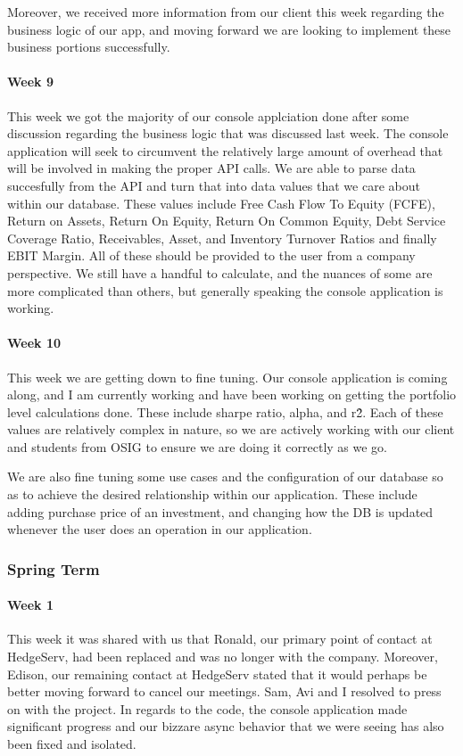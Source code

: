 \documentclass{article}
\begin{document}
Moreover, we received more information from our client this week regarding the business logic of our app, and moving forward we are looking to implement these business portions successfully.
\paragraph{Week 9}
This week we got the majority of our console applciation done after some discussion regarding the business logic that was discussed last week. The console application will seek to circumvent the relatively large amount of overhead that will be involved in making the proper API calls. We are able to parse data succesfully from the API and turn that into data values that we care about within our database. These values include Free Cash Flow To Equity (FCFE), Return on Assets, Return On Equity, Return On Common Equity, Debt Service Coverage Ratio, Receivables, Asset, and Inventory Turnover Ratios and finally EBIT Margin. 
All of these should be provided to the user from a company perspective. We still have a handful to calculate, and the nuances of some are more complicated than others, but generally speaking the console application is working. 
\paragraph{Week 10}
This week we are getting down to fine tuning. Our console application is coming along, and I am currently working and have been working on getting the portfolio level calculations done. These  include sharpe ratio, alpha, and r\^2. Each of these values are relatively complex in nature, so we are actively working with our client and students from OSIG to ensure we are doing it correctly as we go.  
 
We are also fine tuning some use cases and the configuration of our database so as to achieve the desired relationship within our application. These include adding purchase price of an investment, and changing how the DB is updated whenever the user does an operation in our application. 

\subsubsection{Spring Term}
\paragraph{Week 1}
This week it was shared with us that Ronald, our primary point of contact at HedgeServ, had been replaced and was no longer with the company. Moreover, Edison, our remaining contact at HedgeServ stated that it would perhaps be better moving forward to cancel our meetings. Sam, Avi and I resolved to press on with the project. In regards to the code, the console application made significant progress and our bizzare async behavior that we were seeing has also been fixed and isolated. 
\end{document}
